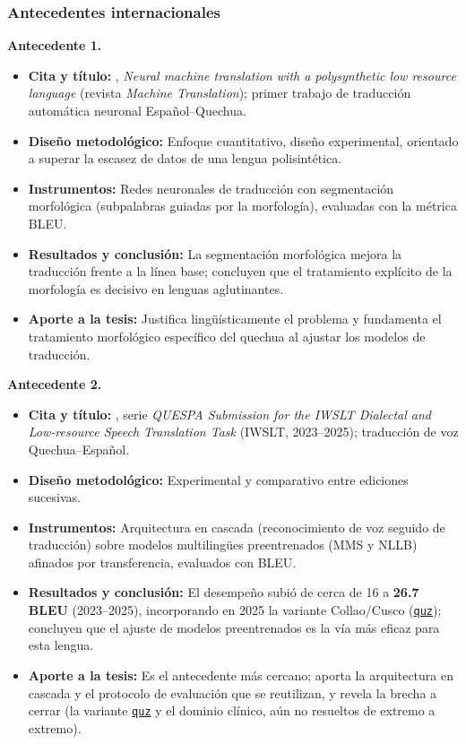 \documentclass[12pt,a4paper]{article}
\newenvironment{bloqueObsDos}{\par\color{verdeOK}}{\par}
\DeclareRobustCommand{\sig}[1]{\hyperlink{sig:#1}{\texttt{#1}}}
\begin{document}
\subsubsection{Antecedentes internacionales}
\begin{bloqueObsDos}
\noindent\textbf{Antecedente 1.}
\begin{itemize}\setlength{\itemsep}{1pt}
  \item \textbf{Cita y t{\'i}tulo:} \textcite{ortega2020quechua}, \emph{Neural machine translation with a polysynthetic low resource language} (revista \emph{Machine Translation}); primer trabajo de traducci{\'o}n autom{\'a}tica neuronal Espa{\~n}ol--Quechua.
  \item \textbf{Dise{\~n}o metodol{\'o}gico:} Enfoque cuantitativo, dise{\~n}o experimental, orientado a superar la escasez de datos de una lengua polisint{\'e}tica.
  \item \textbf{Instrumentos:} Redes neuronales de traducci{\'o}n con segmentaci{\'o}n morfol{\'o}gica (subpalabras guiadas por la morfolog{\'i}a), evaluadas con la m{\'e}trica BLEU.
  \item \textbf{Resultados y conclusi{\'o}n:} La segmentaci{\'o}n morfol{\'o}gica mejora la traducci{\'o}n frente a la l{\'i}nea base; concluyen que el tratamiento expl{\'i}cito de la morfolog{\'i}a es decisivo en lenguas aglutinantes.
  \item \textbf{Aporte a la tesis:} Justifica ling{\"u}{\'i}sticamente el problema y fundamenta el tratamiento morfol{\'o}gico espec{\'i}fico del quechua al ajustar los modelos de traducci{\'o}n.
\end{itemize}

\noindent\textbf{Antecedente 2.}
\begin{itemize}\setlength{\itemsep}{1pt}
  \item \textbf{Cita y t{\'i}tulo:} \textcite{Ortega2023261,Ortega2025260}, serie \emph{QUESPA Submission for the IWSLT Dialectal and Low-resource Speech Translation Task} (IWSLT, 2023--2025); traducci{\'o}n de voz Quechua--Espa{\~n}ol.
  \item \textbf{Dise{\~n}o metodol{\'o}gico:} Experimental y comparativo entre ediciones sucesivas.
  \item \textbf{Instrumentos:} Arquitectura en cascada (reconocimiento de voz seguido de traducci{\'o}n) sobre modelos multiling{\"u}es preentrenados (MMS y NLLB) afinados por transferencia, evaluados con BLEU.
  \item \textbf{Resultados y conclusi{\'o}n:} El desempe{\~n}o subi{\'o} de cerca de 16 a \textbf{26.7 BLEU} (2023--2025), incorporando en 2025 la variante Collao/Cusco (\sig{quz}); concluyen que el ajuste de modelos preentrenados es la v{\'i}a m{\'a}s eficaz para esta lengua.
  \item \textbf{Aporte a la tesis:} Es el antecedente m{\'a}s cercano; aporta la arquitectura en cascada y el protocolo de evaluaci{\'o}n que se reutilizan, y revela la brecha a cerrar (la variante \sig{quz} y el dominio cl{\'i}nico, a{\'u}n no resueltos de extremo a extremo).
\end{itemize}
\end{bloqueObsDos}
\end{document}
